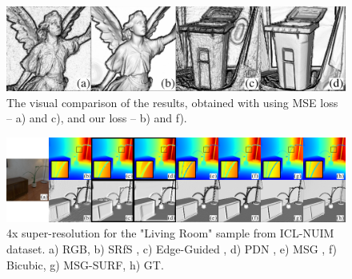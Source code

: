 \begin{figure}[p!]
\begin{center}
\includegraphics[width=0.995\linewidth]{Figures/depth_superresolution/experiment3.slim.png}
\end{center}
   \caption{The visual comparison of the results, obtained with \cite{Ulyanov_2018_CVPR} using MSE loss -- a) and c), and our loss -- b) and f).}
\label{fig:dip_recycle}
\end{figure}

\begin{figure}[p!]
\begin{center}
\includegraphics[width=0.995\linewidth]{Figures/depth_superresolution/experiment1.a.png}
\end{center}
   \caption{4x super-resolution for the "Living Room" sample from ICL-NUIM dataset. a) RGB, b) SRfS \cite{haefner2018fight}, c) Edge-Guided \cite{xie2016edge}, d) PDN \cite{riegler2016deep}, e) MSG \cite{hui2016depth}, f) Bicubic, g) MSG-SURF, h) GT.}
\label{fig:flower_fine}
\end{figure}